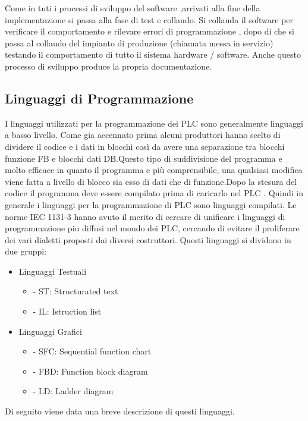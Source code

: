 \documentclass[12pt, a4paper, oneside]{book}
\begin{document}
Come in tuti i processi di sviluppo del software ,arrivati alla fine della implementazione si passa alla fase di test e collaudo. Si collauda il software per verificare il comportamento e rilevare errori di programmazione , dopo di che si passa al collaudo del impianto di produzione (chiamata messa in servizio) testando il comportamento di tutto il sistema hardware / software. Anche questo processo di
sviluppo produce la propria documentazione.

\subsection{Linguaggi di Programmazione}
I linguaggi utilizzati per la programmazione dei PLC sono generalmente linguaggi a basso livello. Come gia accennato prima alcuni produttori hanno scelto di dividere il codice e i dati in blocchi così da avere una separazione tra blocchi funzione FB e blocchi dati DB.Questo tipo di suddivisione del programma e molto efficace in quanto il programma e più comprensibile, una qualsiasi modifica viene  fatta a livello di blocco sia esso di dati che di funzione.Dopo la stesura del codice il programma deve essere compilato prima di caricarlo nel PLC . Quindi in generale i linguaggi per la programmazione di PLC sono linguaggi compilati. Le norme IEC 1131-3 hanno avuto il merito di cercare di unificare i linguaggi di programmazione piu diffusi nel mondo dei PLC, cercando di evitare il proliferare dei vari dialetti proposti dai diversi costruttori.
Questi linguaggi si dividono in due gruppi:

\begin{itemize}
	\item  Linguaggi Testuali 
		\begin{itemize}
			\item - ST: Structurated text
			\item - IL: Istruction list
		\end{itemize}
	\item Linguaggi Grafici
		\begin{itemize}
			\item - SFC: Sequential function chart
			\item - FBD: Function block diagram
			\item - LD: Ladder diagram
		\end{itemize}
\end{itemize}


Di seguito viene data una breve descrizione di questi linguaggi.
\end{document}
